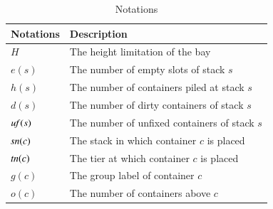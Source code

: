 \documentclass[review,3p,times,authoryear,12pt]{elsarticle}
\begin{document}
\begin{table}[htbp]
  \centering
  \caption{Notations}
  \label{tab:1}
    \begin{tabular}{l|l}
    \hline
    Notations         & Description \\
    \hline
    $H$               & The height limitation of the bay\\
    $e(s)$            & The number of empty slots of stack $s$\\
    $h(s)$            & The number of containers piled at stack $s$\\
    $d(s)$            & The number of dirty containers of stack $s$\\
    $\id{uf}(s)$      & The number of unfixed containers of stack $s$\\
    $\id{sn}(c)$      & The stack in which container $c$ is placed\\
    $\id{tn}(c)$      & The tier at which container $c$ is placed\\
    $g(c)$            & The group label of container $c$\\
    $o(c)$          & The number of containers above $c$\\
    \hline
    \end{tabular}
\end{table}




\end{document}
